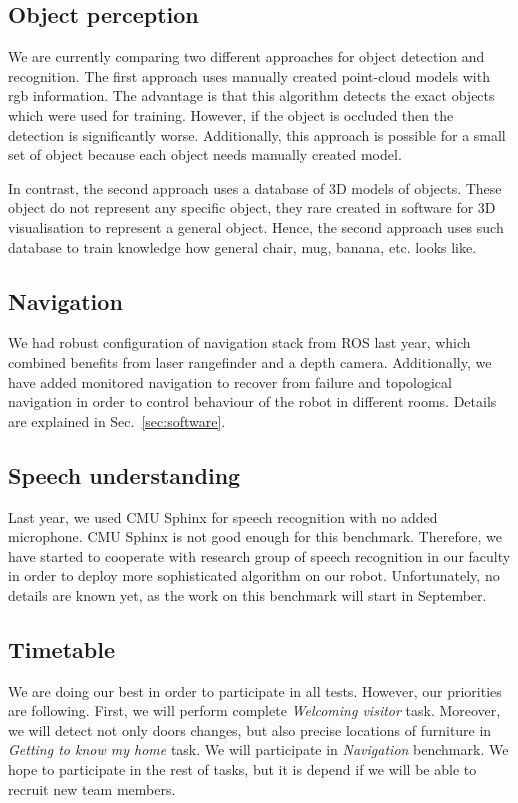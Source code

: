 \subsection{Object perception} 

We are currently comparing two different approaches for object detection and recognition. The first approach uses manually created point-cloud models with rgb information. 
The advantage is that this algorithm detects the exact objects which were used for training. 
However, if the object is occluded then the detection is significantly worse.
Additionally, this approach is possible for a small set of object because each object needs manually created model. 

In contrast, the second approach uses a database of 3D models of objects. These object do not represent any specific object, they rare created in software for 3D visualisation to represent a general object. 
Hence, the second approach uses such database to train knowledge how general chair, mug, banana, etc. looks like. 

\subsection{Navigation}

We had robust configuration of navigation stack from ROS last year, which combined benefits from laser rangefinder and a depth camera. 
Additionally, we have added monitored navigation to recover from failure and topological navigation in order to control behaviour of the robot in different rooms. Details are explained in Sec.~\ref{sec:software}.

\subsection{\label{sec:speechrec}Speech understanding}

Last year, we used CMU Sphinx for speech recognition with no added microphone. CMU Sphinx is not good enough for this benchmark. 
Therefore, we have started to cooperate with research group of speech recognition in our faculty in order to deploy more sophisticated algorithm on our robot. 
Unfortunately, no details are known yet, as the work on this benchmark will start in September.

\subsection{Timetable}

We are doing our best in order to participate in all tests. However, our priorities are following.
First, we will perform complete \textit{Welcoming visitor} task. 
Moreover, we will detect not only doors changes, but also precise locations of furniture in \textit{Getting to know my home} task. 
We will participate in \textit{Navigation} benchmark. We hope to participate in the rest of tasks, but it is depend if we will be able to recruit new team members.


